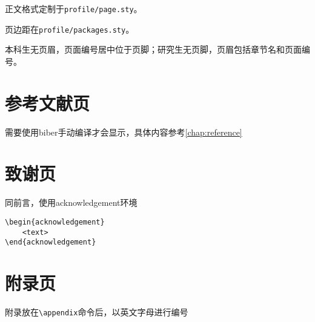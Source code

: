 正文格式定制于\texttt{profile/page.sty}。

页边距在\texttt{profile/packages.sty}。

本科生无页眉，页面编号居中位于页脚；研究生无页脚，页眉包括章节名和页面编号。


\section{参考文献页}

需要使用biber手动编译才会显示，具体内容参考\cref{chap:reference}

\section{致谢页}

同前言，使用acknowledgement环境

\begin{lstlisting}
\begin{acknowledgement}
    <text>
\end{acknowledgement}
\end{lstlisting}

\section{附录页}

附录放在\lstinline|\appendix|命令后，以英文字母进行编号
